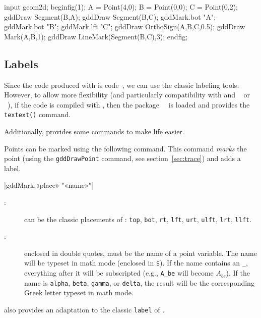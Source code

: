 \documentclass[a4paper,english]{article}
\begin{document}
  
\begin{ExempleMP}
input geom2d;
beginfig(1);
A = Point(4,0);
B = Point(0,0);
C = Point(0,2);
gddDraw Segment(B,A);
gddDraw Segment(B,C);
gddMark.bot "A";
gddMark.bot "B";
gddMark.lft "C";
gddDraw OrthoSign(A,B,C,0.5);
gddDraw Mark(A,B,1);
gddDraw LineMark(Segment(B,C),3);
endfig;
\end{ExempleMP}
  
  \subsection{Labels}

  Since the code produced with \mpgeomdd is \MP{} code~\cite{ctan-metapost}, we can use the classic labeling tools. However, to allow more flexibility (and particularly compatibility with  and ~\cite{ctan-luamplib} or ~\cite{ctan-minim-mp}), if the code is compiled with \MP{}, then the package~~\cite{ctan-latexmp} is loaded and provides the \lstinline+textext()+ command.

  Additionally, \mpgeomdd provides some commands to make life easier.

  Points can be marked using the following command. This command \emph{marks} the point (using the \lstinline+gddDrawPoint+ command, see section~\ref{sec:trace}) and adds a label.
  \begin{colourband}
  \macro|gddMark.«place» "«name»"|
  \begin{description}
    \item[:] can be the classic placements of \MP{}:
    \lstinline+top+, \lstinline+bot+, \lstinline+rt+,
    \lstinline+lft+, \lstinline+urt+, \lstinline+ulft+, \lstinline+lrt+, \lstinline+llft+.
    \item[:] enclosed in double quotes, must be the name of a point variable. The name will be typeset in math mode (enclosed in \lstinline+$+). If the name contains an \lstinline+_+, everything after it will be subscripted (e.g., \lstinline+A_be+ will become $A_{be}$). If the name is \lstinline+alpha+, \lstinline+beta+, \lstinline+gamma+, or \lstinline+delta+, the result will be the corresponding Greek letter typeset in math mode.
  \end{description}
  \end{colourband}

  \mpgeomdd also provides an adaptation to the classic \lstinline+label+ of \MP{}.
\end{document}
